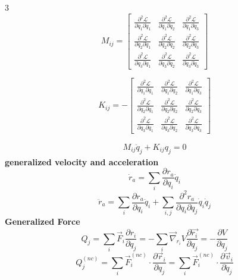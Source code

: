 \documentclass[1pt]{article}
\begin{document}
\begin{multicols}{3}
\[
M_{ij} =
\begin{bmatrix}
\frac{\partial^2 \mathcal{L}}{\partial \dot{q}_1 \partial \dot{q}_1} & \frac{\partial^2 \mathcal{L}}{\partial \dot{q}_1 \partial \dot{q}_2} & \frac{\partial^2 \mathcal{L}}{\partial \dot{q}_1 \partial \dot{q}_3} \\
\frac{\partial^2 \mathcal{L}}{\partial \dot{q}_2 \partial \dot{q}_1} & \frac{\partial^2 \mathcal{L}}{\partial \dot{q}_2 \partial \dot{q}_2} & \frac{\partial^2 \mathcal{L}}{\partial \dot{q}_2 \partial \dot{q}_3} \\
\frac{\partial^2 \mathcal{L}}{\partial \dot{q}_3 \partial \dot{q}_1} & \frac{\partial^2 \mathcal{L}}{\partial \dot{q}_3 \partial \dot{q}_2} & \frac{\partial^2 \mathcal{L}}{\partial \dot{q}_3 \partial \dot{q}_3}
\end{bmatrix}
\]

\[
K_{ij} =
-\begin{bmatrix}
\frac{\partial^2 \mathcal{L}}{\partial q_1 \partial q_1} & \frac{\partial^2 \mathcal{L}}{\partial q_1 \partial q_2} & \frac{\partial^2 \mathcal{L}}{\partial q_1 \partial q_3} \\
\frac{\partial^2 \mathcal{L}}{\partial q_2 \partial q_1} & \frac{\partial^2 \mathcal{L}}{\partial q_2 \partial q_2} & \frac{\partial^2 \mathcal{L}}{\partial q_2 \partial q_3} \\
\frac{\partial^2 \mathcal{L}}{\partial q_3 \partial q_1} & \frac{\partial^2 \mathcal{L}}{\partial q_3 \partial q_2} & \frac{\partial^2 \mathcal{L}}{\partial q_3 \partial q_3}
\end{bmatrix}
\]


\begin{align*}
    M_{ij} \ddot{q}_j + K_{ij} q_j = 0
\end{align*}
\textbf{generalized velocity and acceleration}
\begin{equation*}
    \dot{r}_a = \sum_i \frac{\partial r_a}{\partial q_i} \dot{q}_i
\end{equation*}
\begin{equation*}
    \ddot{r}_a = \sum_i \frac{\partial r_a}{\partial q_i} \ddot{q}_i + \sum_{i,j} \frac{\partial^2 r_a}{\partial q_i \partial q_j} \dot{q}_i \dot{q}_j
\end{equation*}
\textbf{Generalized Force}
\begin{equation*}
    Q_{j}=\sum_{i}\vec{F}_{i}\frac{\partial r_{i}}{\partial q_{j}}=-\sum_i \vec{\nabla}_{r_i} V \frac{\partial \overrightarrow{r_i}}{\partial q_j}=-\frac{\partial V}{\partial q_j}
\end{equation*}
\begin{equation*}Q_j^{(n c)}=\sum_i \vec{F}_i^{(n c)} \cdot \frac{\partial \vec{r}_i}{\partial q_j}=\sum_i \vec{F}_i^{(n c)} \cdot \frac{\partial \vec{v}_i}{\partial \dot{q}_j}\end{equation*}


\end{multicols}
\end{document}
